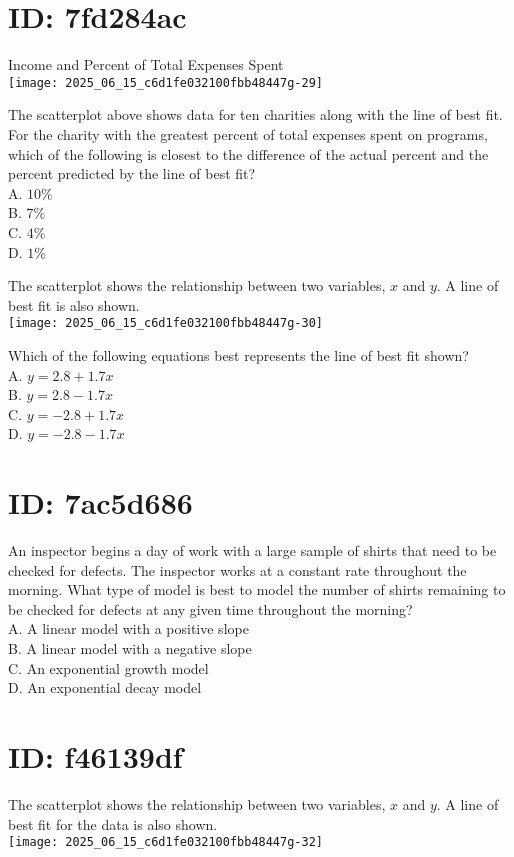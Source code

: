 \section*{ID: 7fd284ac}
Income and Percent of Total Expenses Spent\\
\texttt{[image: 2025\_06\_15\_c6d1fe032100fbb48447g-29]}

The scatterplot above shows data for ten charities along with the line of best fit. For the charity with the greatest percent of total expenses spent on programs, which of the following is closest to the difference of the actual percent and the percent predicted by the line of best fit?\\
A. $10 \%$\\
B. $7 \%$\\
C. $4 \%$\\
D. $1 \%$

The scatterplot shows the relationship between two variables, $x$ and $y$. A line of best fit is also shown.\\
\texttt{[image: 2025\_06\_15\_c6d1fe032100fbb48447g-30]}

Which of the following equations best represents the line of best fit shown?\\
A. $y=2.8+1.7 x$\\
B. $y=2.8-1.7 x$\\
C. $y=-2.8+1.7 x$\\
D. $y=-2.8-1.7 x$

\section*{ID: 7ac5d686}
An inspector begins a day of work with a large sample of shirts that need to be checked for defects. The inspector works at a constant rate throughout the morning. What type of model is best to model the number of shirts remaining to be checked for defects at any given time throughout the morning?\\
A. A linear model with a positive slope\\
B. A linear model with a negative slope\\
C. An exponential growth model\\
D. An exponential decay model

\section*{ID: f46139df}
The scatterplot shows the relationship between two variables, $x$ and $y$. A line of best fit for the data is also shown.\\
\texttt{[image: 2025\_06\_15\_c6d1fe032100fbb48447g-32]}

